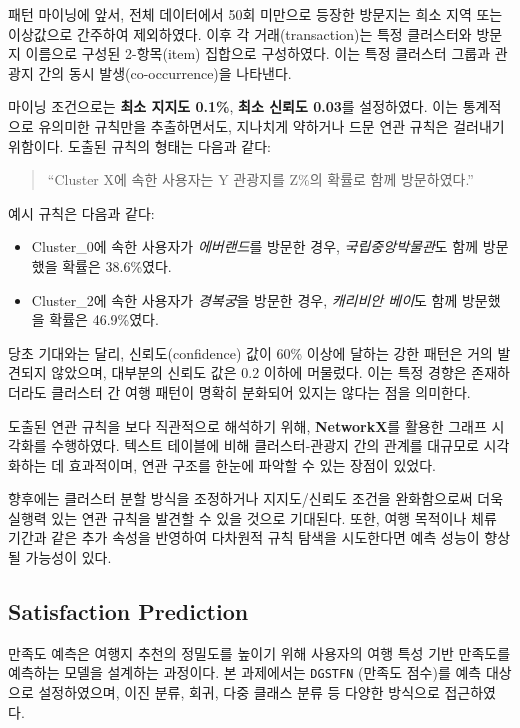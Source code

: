 \documentclass[sigconf]{acmart}
\begin{document}
\begin{CJK}{UTF8}{mj}
패턴 마이닝에 앞서, 전체 데이터에서 50회 미만으로 등장한 방문지는 희소 지역 또는 이상값으로 간주하여 제외하였다. 이후 각 거래(transaction)는 특정 클러스터와 방문지 이름으로 구성된 2-항목(item) 집합으로 구성하였다. 이는 특정 클러스터 그룹과 관광지 간의 동시 발생(co-occurrence)을 나타낸다.

마이닝 조건으로는 \textbf{최소 지지도 0.1\%}, \textbf{최소 신뢰도 0.03}를 설정하였다. 이는 통계적으로 유의미한 규칙만을 추출하면서도, 지나치게 약하거나 드문 연관 규칙은 걸러내기 위함이다. 도출된 규칙의 형태는 다음과 같다:  
\begin{quote}
    “Cluster X에 속한 사용자는 Y 관광지를 Z\%의 확률로 함께 방문하였다.”
\end{quote}

예시 규칙은 다음과 같다:
\begin{itemize}
  \item Cluster\_0에 속한 사용자가 \textit{에버랜드}를 방문한 경우, \textit{국립중앙박물관}도 함께 방문했을 확률은 38.6\%였다.
  \item Cluster\_2에 속한 사용자가 \textit{경복궁}을 방문한 경우, \textit{캐리비안 베이}도 함께 방문했을 확률은 46.9\%였다.
\end{itemize}

당초 기대와는 달리, 신뢰도(confidence) 값이 60\% 이상에 달하는 강한 패턴은 거의 발견되지 않았으며, 대부분의 신뢰도 값은 0.2 이하에 머물렀다. 이는 특정 경향은 존재하더라도 클러스터 간 여행 패턴이 명확히 분화되어 있지는 않다는 점을 의미한다.

도출된 연관 규칙을 보다 직관적으로 해석하기 위해, \textbf{NetworkX}를 활용한 그래프 시각화를 수행하였다. 텍스트 테이블에 비해 클러스터-관광지 간의 관계를 대규모로 시각화하는 데 효과적이며, 연관 구조를 한눈에 파악할 수 있는 장점이 있었다.

향후에는 클러스터 분할 방식을 조정하거나 지지도/신뢰도 조건을 완화함으로써 더욱 실행력 있는 연관 규칙을 발견할 수 있을 것으로 기대된다. 또한, 여행 목적이나 체류 기간과 같은 추가 속성을 반영하여 다차원적 규칙 탐색을 시도한다면 예측 성능이 향상될 가능성이 있다.


\subsection{Satisfaction Prediction}

만족도 예측은 여행지 추천의 정밀도를 높이기 위해 사용자의 여행 특성 기반 만족도를 예측하는 모델을 설계하는 과정이다.  
본 과제에서는 \texttt{DGSTFN} (만족도 점수)를 예측 대상으로 설정하였으며, 이진 분류, 회귀, 다중 클래스 분류 등 다양한 방식으로 접근하였다.


\end{CJK}
\end{document}
